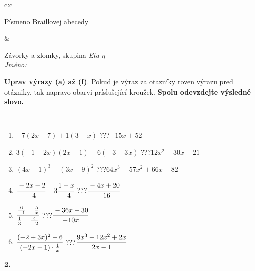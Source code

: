 \documentclass[10pt]{report}
\begin{document}
\begin{tabular}{c:c}
\begin{minipage}[c][104.5mm][t]{0.5\linewidth}
\begin{center}
\begin{minipage}{0.20\linewidth}
\begin{center}
{\small Písmeno Braillovej abecedy}
\end{center}
\end{minipage}
\end{center}
\end{minipage}
&
\begin{minipage}[c][104.5mm][t]{0.5\linewidth}
\begin{center}
\vspace{7mm}
{\huge Závorky a zlomky, skupina \textit{Eta $\eta$} -}\\[5mm]
\textit{Jméno:}\phantom{xxxxxxxxxxxxxxxxxxxxxxxxxxxxxxxxxxxxxxxxxxxxxxxxxxxxxxxxxxxxxxxxx}\\[5mm]
\begin{minipage}{0.95\linewidth}
\begin{center}
\textbf{Uprav výrazy (a) až (f)}. Pokud je výraz za otazníky roven výrazu pred otázniky, tak napravo obarvi príslušející kroužek. \textbf{Spolu odevzdejte výsledné slovo.}
\end{center}
\end{minipage}
\\[1mm]
\begin{minipage}{0.79\linewidth}
\begin{center}
\begin{varwidth}{\linewidth}
\begin{enumerate}
\normalsize
\item $-7(2x-7)+1(3-x)$\quad \dotfill\; ???\;\dotfill \quad $-15x+52$
\item $3(-1+2x)(2x-1)-6(-3+3x)$\quad \dotfill\; ???\;\dotfill \quad $12x^2+30x-21$
\item $(4x-1)^3-(3x-9)^2$\quad \dotfill\; ???\;\dotfill \quad $64x^3-57x^2+66x-82$
\item $\cfrac{-2x-2}{-4}-3\cfrac{1-x}{-4}$\quad \dotfill\; ???\;\dotfill \quad $\cfrac{-4x+20}{-16}$
\item $\cfrac{\frac{6}{-1}-\frac{5}{x}}{\frac{1}{3}+\frac{4}{-2}}$\quad \dotfill\; ???\;\dotfill \quad $\cfrac{-36x-30}{-10x}$
\item $\cfrac{(-2+3x)^2-6}{(-2x-1)\cdot\frac{1}{x}}$\quad \dotfill\; ???\;\dotfill \quad $\cfrac{9x^3-12x^2+2x}{2x-1}$
\end{enumerate}
\end{varwidth}
\end{center}
\end{minipage}
\begin{minipage}{0.20\linewidth}
\begin{center}
{\Huge\bfseries 2.} \\[2mm]

\end{center}
\end{minipage}
\end{center}
\end{minipage}
\end{tabular}
\end{document}
